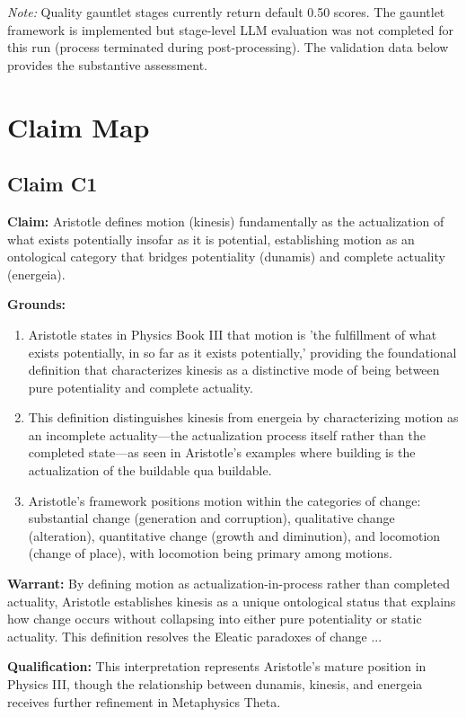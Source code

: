 \documentclass[12pt,a4paper]{article}
\begin{document}
\noindent\textit{Note:} Quality gauntlet stages currently return default 0.50 scores. The gauntlet framework is implemented but stage-level LLM evaluation was not completed for this run (process terminated during post-processing). The validation data below provides the substantive assessment.


\section{Claim Map}

\subsection*{Claim C1}

\textbf{Claim:} Aristotle defines motion (kinesis) fundamentally as the actualization of what exists potentially insofar as it is potential, establishing motion as an ontological category that bridges potentiality (dunamis) and complete actuality (energeia).

\textbf{Grounds:}
\begin{enumerate}[nosep]
\item Aristotle states in Physics Book III that motion is 'the fulfillment of what exists potentially, in so far as it exists potentially,' providing the foundational definition that characterizes kinesis as a distinctive mode of being between pure potentiality and complete actuality.
\item This definition distinguishes kinesis from energeia by characterizing motion as an incomplete actuality—the actualization process itself rather than the completed state—as seen in Aristotle's examples where building is the actualization of the buildable qua buildable.
\item Aristotle's framework positions motion within the categories of change: substantial change (generation and corruption), qualitative change (alteration), quantitative change (growth and diminution), and locomotion (change of place), with locomotion being primary among motions.
\end{enumerate}

\textbf{Warrant:} By defining motion as actualization-in-process rather than completed actuality, Aristotle establishes kinesis as a unique ontological status that explains how change occurs without collapsing into either pure potentiality or static actuality. This definition resolves the Eleatic paradoxes of change ...

\textbf{Qualification:} This interpretation represents Aristotle's mature position in Physics III, though the relationship between dunamis, kinesis, and energeia receives further refinement in Metaphysics Theta.
\end{document}
